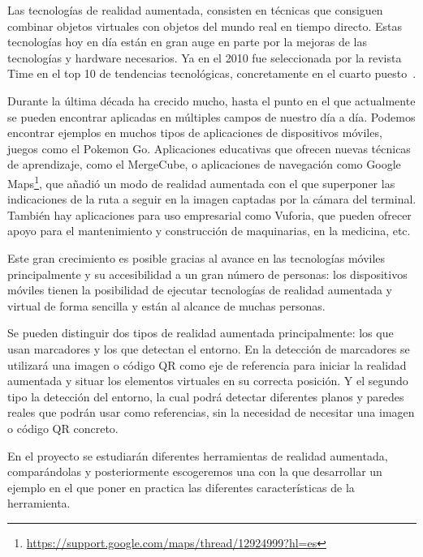 
Las tecnologías de realidad aumentada, consisten en técnicas que consiguen combinar objetos virtuales con objetos del mundo real en tiempo directo. 
Estas tecnologías hoy en día están en gran auge en parte por la mejoras de las tecnologías y hardware necesarios. Ya en el 2010 fue seleccionada por la revista Time en el top 10 de tendencias tecnológicas, concretamente en el cuarto puesto~\cite{fletcher_2010}. 

Durante la última década ha crecido mucho, hasta el punto en el que actualmente se pueden encontrar aplicadas en múltiples campos de nuestro día a día. Podemos encontrar ejemplos en muchos tipos de aplicaciones de dispositivos móviles, juegos como el Pokemon Go. Aplicaciones educativas que ofrecen nuevas técnicas de aprendizaje, como el MergeCube, o aplicaciones de navegación como Google Maps\footnote{\url{https://support.google.com/maps/thread/12924999?hl=es}}, que añadió un modo de realidad aumentada con el que superponer las indicaciones de la ruta a seguir en la imagen captadas por la cámara del terminal. También hay aplicaciones para uso empresarial como Vuforia, que pueden ofrecer apoyo para el mantenimiento y construcción de maquinarias, en la medicina, etc.

Este gran crecimiento es posible gracias al avance en las tecnologías móviles principalmente y su accesibilidad a un gran número de personas: los dispositivos móviles tienen la posibilidad de ejecutar tecnologías de realidad aumentada y virtual de forma sencilla y están al alcance de muchas personas.




Se pueden distinguir dos tipos de realidad aumentada principalmente: los que usan marcadores y los que detectan el entorno. En la detección de marcadores se utilizará una imagen o código QR como eje de referencia para iniciar la realidad aumentada y situar los elementos virtuales en su correcta posición. 
Y el segundo tipo la detección del entorno, la cual podrá detectar diferentes planos y paredes reales que podrán usar como referencias, sin la necesidad de necesitar una imagen o código QR concreto.


En el proyecto se estudiarán diferentes herramientas de realidad aumentada, comparándolas y posteriormente escogeremos una con la que desarrollar un ejemplo en el que poner en practica las diferentes características de la herramienta.


